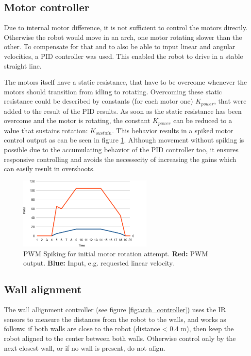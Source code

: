 \subsection{Motor controller}

Due to internal motor difference, it is not sufficient to control the motors directly.
Otherwise the robot would move in an arch, one motor rotating slower than the other.
To compensate for that and to also be able to input linear and angular velocities, a PID controller was used. 
This enabled the robot to drive in a stable straight line.

The motors itself have a static resistance, that have to be overcome whenever the motors should transition from idling to rotating.
Overcoming these static resistance could be described by constants (for each motor one) $K_{power}$, that were added to the result of the PID results.
As soon as the static resistance has been overcome and the motor is rotating, the constant $K_{power}$ can be reduced to a value that sustains rotation: $K_{sustain}$.
This behavior results in a spiked motor control output as can be seen in figure \ref{fig:pwm_spiker}.
Although movement without spiking is possible due to the accumulating behavior of the PID controller too, it ensures responsive controlling and avoids the necessecity of increasing the gains which can easily result in overshoots.

\begin{figure}[h]
\begin{center}
\includegraphics[width=0.6\textwidth]{figures/pwm_spike.pdf}
\end{center}
\caption{PWM Spiking for initial motor rotation attempt. \textbf{Red:} PWM output. \textbf{Blue:} Input, e.g. requested linear velocity.}
\label{fig:pwm_spiker}
\end{figure}

\subsection{Wall alignment}

The wall allignment controller (see figure \ref{fig:arch_controller}) uses the IR sensors to measure the distances from the robot to the walls, and works as follows: if both walls are close to the robot (distance < 0.4 m), then keep the robot aligned to the center between both walls.
Otherwise control only by the next closest wall, or if no wall is present, do not align.